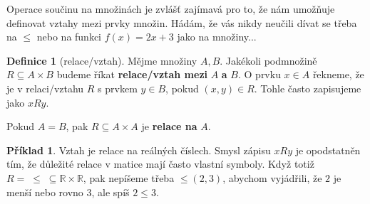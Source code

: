 \documentclass[a4paper,11pt]{article}
\theoremstyle{definition}
\newtheorem{exm}[thm]{Příklad}
\newtheorem{dfn}[thm]{Definice}
\newcommand{\R}{\mathbb{R}}
\begin{document}
Operace součinu na množinách je zvlášť zajímavá pro to, že nám umožňuje
definovat vztahy mezi prvky množin. Hádám, že vás nikdy neučili dívat se třeba
na $ \leq $ nebo na funkci $f(x) = 2x + 3$ jako na množiny...

\begin{dfn}[relace/vztah]
 Mějme množiny $A,B$. Jakékoli podmnožině $R \subseteq A \times B$ budeme říkat
 \textbf{relace/vztah mezi} $A$ \textbf{a} $B$. O prvku $x \in A$ řekneme, že je
 v relaci/vztahu $R$ s prvkem $y \in B$, pokud $(x,y) \in R$. Tohle často
 zapisujeme jako $xRy$.

 Pokud $A = B$, pak $R \subseteq A \times A$ je \textbf{relace na} $A$.
\end{dfn}

\begin{exm}
 Vztah  je relace na reálných číslech. Smysl zápisu $xRy$
 je opodstatněn tím, že důležité relace v matice mají často vlastní symboly.
 Když totiž $R = \; \leq \; \subseteq \R \times \R$, pak nepíšeme třeba $
 \leq\!\!(2,3)$, abychom vyjádřili, že $2$ je menší nebo rovno $3$, ale spíš $2
 \leq 3$.
\end{exm}
\end{document}
